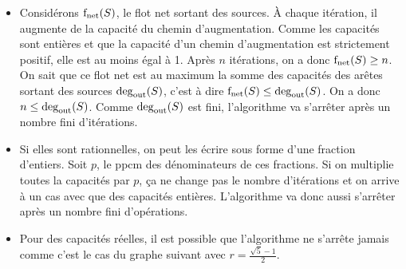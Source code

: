\begin{solution}
  \begin{itemize}
    \item
      Considérons $\operatorname{f_\mathrm{net}}(S)$, le flot net sortant des sources.
      À chaque itération, il augmente de la capacité du chemin d'augmentation.
      Comme les capacités sont entières et que la capacité d'un chemin d'augmentation est strictement positif,
      elle est au moins égal à 1.
      Après $n$ itérations, on a donc $\operatorname{f_\mathrm{net}}(S) \geq n$.
      On sait que ce flot net est au maximum la somme des capacités des arêtes sortant des sources $\operatorname{\deg_\mathrm{out}}(S)$,
      c'est à dire $\operatorname{f_\mathrm{net}}(S) \leq \operatorname{\deg_\mathrm{out}}(S)$.
      On a donc $n \leq \operatorname{\deg_\mathrm{out}}(S)$. Comme $\operatorname{\deg_\mathrm{out}}(S)$ est fini, l'algorithme va s'arrêter après un nombre fini d'itérations.
    \item
      Si elles sont rationnelles, on peut les écrire sous forme d'une fraction d'entiers.
      Soit $p$, le ppcm des dénominateurs de ces fractions.
      Si on multiplie toutes la capacités par $p$, ça ne change pas le nombre d'itérations
      et on arrive à un cas avec que des capacités entières.
      L'algorithme va donc aussi s'arrêter après un nombre fini d'opérations.
    \item
      Pour des capacités réelles, il est possible que l'algorithme ne s'arrête jamais comme c'est le cas du
      graphe suivant avec $r = \frac{\sqrt{5} - 1}{2}$.
      \begin{center}
      \end{center}


\end{itemize}
\end{solution}
